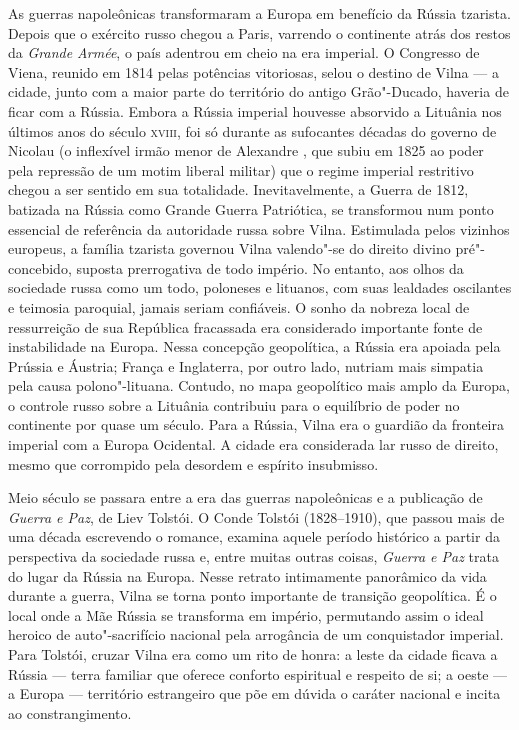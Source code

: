 
As guerras napoleônicas transformaram a Europa em benefício da Rússia
tzarista. Depois que o exército russo chegou a Paris, varrendo o
continente atrás dos restos da \textit{Grande Armée}, o país adentrou em
cheio na era imperial. 
O Congresso de Viena, reunido em 1814 pelas
potências vitoriosas, selou o destino de Vilna --- a cidade, junto com
a maior parte do território do antigo Grão"-Ducado, haveria de ficar com a
Rússia. Embora a Rússia imperial houvesse absorvido a Lituânia nos
últimos anos do século \textsc{xviii}, foi só durante as sufocantes décadas do
governo de Nicolau  (o inflexível irmão menor de Alexandre , que subiu
em 1825 ao poder pela repressão de um motim liberal militar) que o
regime imperial restritivo chegou a ser sentido em sua totalidade.
Inevitavelmente, a Guerra de 1812, batizada na Rússia como Grande Guerra
Patriótica, se transformou num ponto essencial de referência da
autoridade russa sobre Vilna. Estimulada pelos vizinhos europeus, a
família tzarista governou Vilna valendo"-se do direito divino
pré"-concebido, suposta prerrogativa de todo império. No entanto, aos
olhos da sociedade russa como um todo, poloneses e lituanos, com suas
lealdades oscilantes e teimosia paroquial, jamais seriam confiáveis. O
sonho da nobreza local de ressurreição de sua República fracassada era
considerado importante fonte de instabilidade na Europa. Nessa concepção
geopolítica, a Rússia era apoiada pela Prússia e Áustria; França e
Inglaterra, por outro lado, nutriam mais simpatia pela causa
polono"-lituana. Contudo, no mapa geopolítico mais amplo da Europa, o
controle russo sobre a Lituânia contribuiu para o equilíbrio de poder no
continente por quase um século. Para a Rússia, Vilna era o guardião da
fronteira imperial com a Europa Ocidental. A cidade era considerada lar
russo de direito, mesmo que corrompido pela desordem e espírito
insubmisso.

Meio século se passara entre a era das guerras napoleônicas e a
publicação de \textit{Guerra e Paz}, de Liev Tolstói. O Conde Tolstói
(1828--1910), que passou mais de uma década escrevendo o romance, examina
aquele período histórico a partir da perspectiva da sociedade russa e,
entre muitas outras coisas, \textit{Guerra e Paz} trata do lugar da Rússia
na Europa. Nesse retrato intimamente panorâmico da vida durante a
guerra, Vilna se torna ponto importante de transição geopolítica. É o
local onde a Mãe Rússia se transforma em império, permutando assim o
ideal heroico de auto"-sacrifício nacional pela arrogância de um
conquistador imperial. Para Tolstói, cruzar Vilna era como um rito de
honra: a leste da cidade ficava a Rússia --- terra familiar que oferece
conforto espiritual e respeito de si; a oeste --- a Europa --- território
estrangeiro que põe em dúvida o caráter nacional e incita ao
constrangimento.

